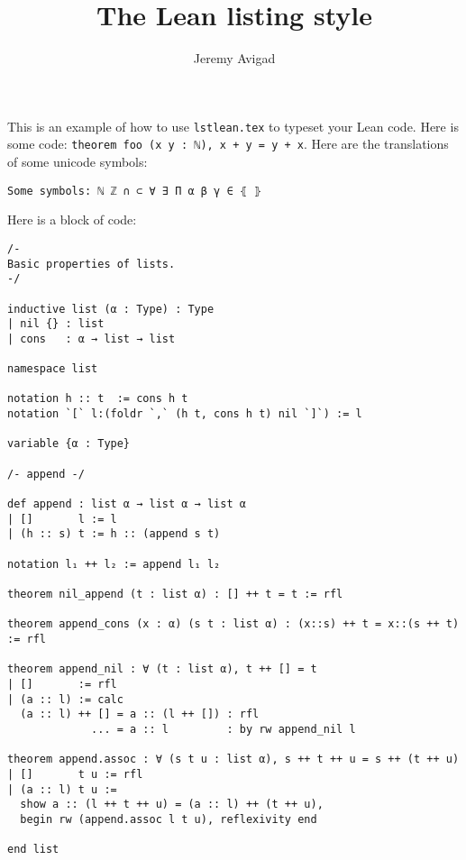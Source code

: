 \documentclass{article}
\title{The Lean listing style}
\author{Jeremy Avigad}
\begin{document}
\maketitle 

This is an example of how to use \verb=lstlean.tex= to typeset your Lean code. Here is some code: \lstinline{theorem foo (x y : ℕ), x + y = y + x}.  Here are the translations of some unicode symbols:
\begin{lstlisting}
Some symbols: ℕ ℤ ∩ ⊂ ∀ ∃ Π α β γ ∈ ⦃ ⦄
\end{lstlisting}
Here is a block of code:
\begin{lstlisting}
/-
Basic properties of lists.
-/

inductive list (α : Type) : Type
| nil {} : list
| cons   : α → list → list

namespace list

notation h :: t  := cons h t
notation `[` l:(foldr `,` (h t, cons h t) nil `]`) := l

variable {α : Type}

/- append -/

def append : list α → list α → list α
| []       l := l
| (h :: s) t := h :: (append s t)

notation l₁ ++ l₂ := append l₁ l₂

theorem nil_append (t : list α) : [] ++ t = t := rfl

theorem append_cons (x : α) (s t : list α) : (x::s) ++ t = x::(s ++ t) := rfl

theorem append_nil : ∀ (t : list α), t ++ [] = t
| []       := rfl
| (a :: l) := calc
  (a :: l) ++ [] = a :: (l ++ []) : rfl
             ... = a :: l         : by rw append_nil l

theorem append.assoc : ∀ (s t u : list α), s ++ t ++ u = s ++ (t ++ u)
| []       t u := rfl
| (a :: l) t u :=
  show a :: (l ++ t ++ u) = (a :: l) ++ (t ++ u),
  begin rw (append.assoc l t u), reflexivity end

end list
\end{lstlisting}
\end{document}
